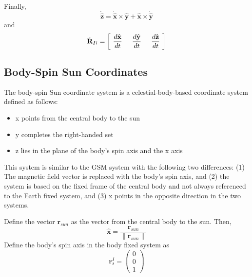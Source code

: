 {\begin{equation}
\end{equation}
%
Finally,
\begin{equation}
    \dot{\hat{\mathbf{z}}} = \dot{\hat{\mathbf{x}}} \times
    \hat{\mathbf{y}}+ \hat{\mathbf{x}} \times
    \dot{\hat{\mathbf{y}}}
\end{equation}
%
and
%
\begin{equation}
     \dot{\mathbf{R}}_{Ii} = \left[\hspace{.05 in} \frac{d\hat{\mathbf{x}}}{dt} \hspace{.2 in}
     \frac{d\hat{\mathbf{y}}}{dt} \hspace{.2 in} \frac{d\hat{\mathbf{z}}}{dt} \hspace{.05 in} \right]
\end{equation}


\subsection{ Body-Spin Sun Coordinates}

The body-spin Sun coordinate system is a celestial-body-based coordinate system defined as follows:
%
\begin{itemize}
   \item x points from the central body to the sun
   \item y completes the right-handed set
   \item z lies in the plane of the body's spin axis and the x axis
\end{itemize}
%
This system is similar to the GSM system with the following two differences:  (1)  The magnetic field vector is replaced with the body's spin axis, and (2) the system is based on the fixed frame of the central body and not always referenced to the Earth fixed system, and (3) x points in the opposite direction in the two systems.

Define the vector $\mathbf{r}_{sun}$ as the vector from the central body to the sun. Then,
%
\begin{equation}
     \hat{\mathbf{x}} = \frac{\mathbf{r}_{sun}}{\| \mathbf{r}_{sun} \|}
\end{equation}
%
Define the body's spin axis in the body fixed system as
%
\begin{equation}
    \mathbf{r}_s^I =   \begin{pmatrix}
               0\\
                0\\
                1
     \end{pmatrix}
\end{equation}

}

